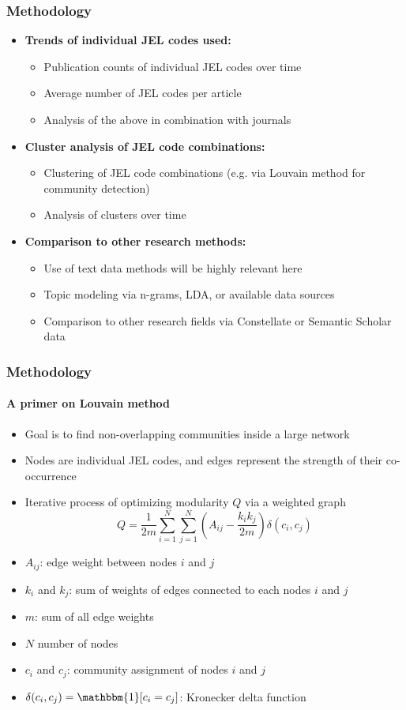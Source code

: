 \documentclass[aspectratio=1610]{beamer}
\begin{document}
\begin{frame}
	\frametitle{Methodology}
	\begin{itemize}
		\item \textbf{Trends of individual JEL codes used:}
		\begin{itemize}
			\item Publication counts of individual JEL codes over time
			\item Average number of JEL codes per article
			\item Analysis of the above in combination with journals
		\end{itemize}

		\item \textbf{Cluster analysis of JEL code combinations:}
		\begin{itemize}
			\item Clustering of JEL code combinations (e.g. via Louvain method for community detection)
			\item Analysis of clusters over time
		\end{itemize}

		\item \textbf{Comparison to other research methods:}
		\begin{itemize}
			\item Use of text data methods will be highly relevant here
			\item Topic modeling via n-grams, LDA, or available data sources
			\item Comparison to other research fields via Constellate or Semantic Scholar data
		\end{itemize}
	\end{itemize}
\end{frame}

\begin{frame}
	\frametitle{Methodology}
	\framesubtitle{A primer on Louvain method}
	\begin{itemize}
		\item Goal is to find non-overlapping communities inside a large network
		\item Nodes are individual JEL codes, and edges represent the strength of their co-occurrence
		\item Iterative process of optimizing modularity $Q$ via a weighted graph
		\begin{equation}
			Q = \frac{1}{2m} \sum_{i=1}^N \sum_{j=1}^N \left( A_{ij} - \frac{k_i k_j}{2m} \right) \delta(c_i, c_j)
		\end{equation}
		\item $A_{ij}$: edge weight between nodes $i$ and $j$
		\item $k_i$ and $k_j$: sum of weights of edges connected to each nodes $i$ and $j$
		\item $m$: sum of all edge weights
		\item $N$ number of nodes
		\item $c_i$ and $c_j$: community assignment of nodes $i$ and $j$
		\item $\delta(c_i, c_j) = \mathbbm{1}[c_i = c_j]$: Kronecker delta function
	\end{itemize}
\end{frame}
\end{document}
